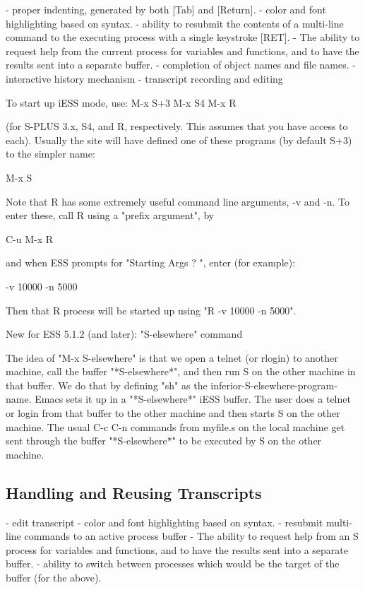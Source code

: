 \documentclass{article}
\begin{document}
- proper indenting, generated by both [Tab] and [Return].
- color and font highlighting based on syntax.
- ability to resubmit the contents of a multi-line command
  to the executing process with a single keystroke [RET].
- The ability to request help from the current process for variables
  and functions, and to have the results sent into a separate buffer.
- completion of object names and file names.
- interactive history mechanism
- transcript recording and editing

To start up iESS mode, use:
   M-x S+3 
   M-x S4
   M-x R

(for S-PLUS 3.x, S4, and R, respectively.  This assumes that you have
access to each).  Usually the site will have defined one of these programs
(by default S+3) to the simpler name:

   M-x S

Note that R has some extremely useful command line arguments, 
-v and -n.   To enter these, call R using a "prefix argument", by

   C-u M-x R

and when ESS prompts for "Starting Args ? ", enter (for example):

   -v 10000 -n 5000

Then that R process will be started up using "R -v 10000 -n 5000".

New for ESS 5.1.2 (and later):  "S-elsewhere" command

  The idea of "M-x S-elsewhere" is that we open a telnet (or rlogin)
  to another machine, call the buffer "*S-elsewhere*", and then run S
  on the other machine in that buffer.  We do that by defining "sh" as
  the inferior-S-elsewhere-program-name.  Emacs sets it up in a
  "*S-elsewhere*" iESS buffer.  The user does a telnet or login from
  that buffer to the other machine and then starts S on the other
  machine.  The usual C-c C-n commands from myfile.s on the local
  machine get sent through the buffer "*S-elsewhere*" to be executed
  by S on the other machine.
                           

\subsection{Handling and Reusing Transcripts}
\label{sec:basic:trans}

- edit transcript
- color and font highlighting based on syntax.
- resubmit multi-line commands to an active process buffer
- The ability to request help from an S process for variables and
  functions, and to have the results sent into a separate buffer.
- ability to switch between processes which would be the target of the 
  buffer (for the above).
\end{document}
